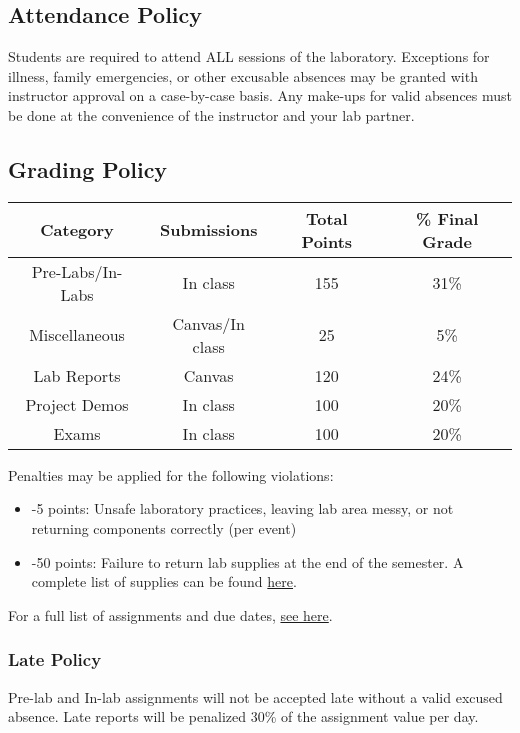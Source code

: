 \documentclass{article}
\begin{document}
\subsection*{Attendance Policy}
Students are required to attend ALL sessions of the laboratory. Exceptions for illness, family emergencies, or other excusable absences may be granted with instructor approval on a case-by-case basis. Any make-ups for valid absences must be done at the convenience of the instructor and your lab partner.

\subsection*{Grading Policy}

\begin{table}[h!]
	\centering
\begin{tabular}[h!]{cccc}
\toprule
	Category & Submissions & Total Points & \% Final Grade\\
	\midrule
	Pre-Labs/In-Labs & In class & 155 & 31\%\\
	Miscellaneous & Canvas/In class & 25 & 5\%\\
	Lab Reports & Canvas & 120 & 24\%\\
	Project Demos & In class & 100 & 20\%\\
	Exams & In class & 100 & 20\%\\
	\bottomrule
\end{tabular}
\end{table}

Penalties may be applied for the following violations:
\begin{itemize}
	\item -5 points: Unsafe laboratory practices, leaving lab area messy, or not returning components correctly (per event)
	\item -50 points: Failure to return lab supplies at the end of the semester. A complete list of supplies can be found \href{https://jameslong12.github.io/BIOE385/general_course_materials/supplies.pdf}{here}.
\end{itemize}

For a full list of assignments and due dates, \href{https://jameslong12.github.io/BIOE385/general_course_materials/assignments.pdf}{see here}.

\subsubsection*{Late Policy}
Pre-lab and In-lab assignments will not be accepted late without a valid excused absence. Late reports will be penalized 30\% of the assignment value per day.
\end{document}

